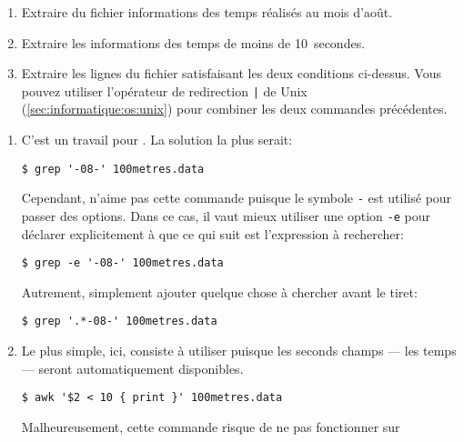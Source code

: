 \begin{exercice}
  \begin{enumerate}
  \item Extraire du fichier  informations des
    temps réalisés au mois d'août.
  \item Extraire les informations des temps de moins de 10~secondes.
  \item Extraire les lignes du fichier satisfaisant les deux
    conditions ci-dessus. Vous pouvez utiliser l'opérateur de
    redirection \verb=|= de Unix (\autoref{sec:informatique:os:unix})
    pour combiner les deux commandes précédentes.
  \end{enumerate}
  \begin{sol}
    \begin{enumerate}
    \item C'est un travail pour . La solution la plus serait:
      \begin{Schunk}
\begin{Verbatim}
$ grep '-08-' 100metres.data
\end{Verbatim}
      \end{Schunk}
      Cependant,  n'aime pas cette commande puisque le
      symbole \verb=-= est utilisé pour passer des options. Dans ce
      cas, il vaut mieux utiliser une option \verb=-e= pour déclarer
      explicitement à  que ce qui suit est l'expression à
      rechercher:
      \begin{Schunk}
\begin{Verbatim}
$ grep -e '-08-' 100metres.data
\end{Verbatim}
      \end{Schunk}
      Autrement, simplement ajouter quelque chose à chercher avant le tiret:
      \begin{Schunk}
\begin{Verbatim}
$ grep '.*-08-' 100metres.data
\end{Verbatim}
      \end{Schunk}
    \item Le plus simple, ici, consiste à utiliser  puisque
      les seconds champs --- les temps --- seront automatiquement
      disponibles.
      \begin{Schunk}
\begin{Verbatim}
$ awk '$2 < 10 { print }' 100metres.data
\end{Verbatim}
      \end{Schunk} %
      Malheureusement, cette commande risque de ne pas fonctionner sur

\end{enumerate}
\end{sol}
\end{exercice}
